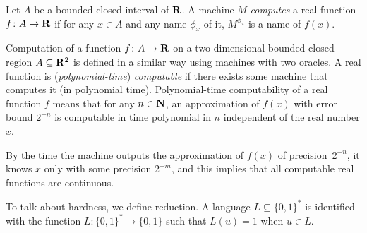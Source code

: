 \begin{definition}
Let $A$ be a bounded closed interval of\/ $\mathbf R$.
A machine $M$ \emph{computes} a real function $f \colon A \to \mathbf R$ 
if for any $x \in A$ and any name $\phi_x$ of it,
$M^{\phi_x}$ is a name of $f(x)$.
\end{definition}

Computation of a function $f \colon A \to \mathbf R$ on
a two-dimensional bounded closed region $A \subseteq \mathbf R ^2$ 
is defined in a similar way using machines with two oracles.
A real function is (\emph{polynomial-time}) \emph{computable} if there exists some machine that computes it (in polynomial time).
Polynomial-time computability of a real function $f$ means that
for any $n \in \mathbf N$, 
an approximation of $f(x)$ with error bound $2^{-n}$
is computable in time polynomial in $n$ 
independent of the real number $x$.

By the time the machine outputs the approximation of $f (x)$ of precision~$2 ^{-n}$, 
it knows $x$ only with some precision $2 ^{-m}$, 
and this implies that all computable real functions are continuous.
%

To talk about hardness, we define reduction. 
A language $L \subseteq \{0, 1\} ^*$ is identified with the function
$L \colon \{0, 1\} ^* \to \{0, 1\}$ such that $L (u) = 1$ when $u \in L$.

